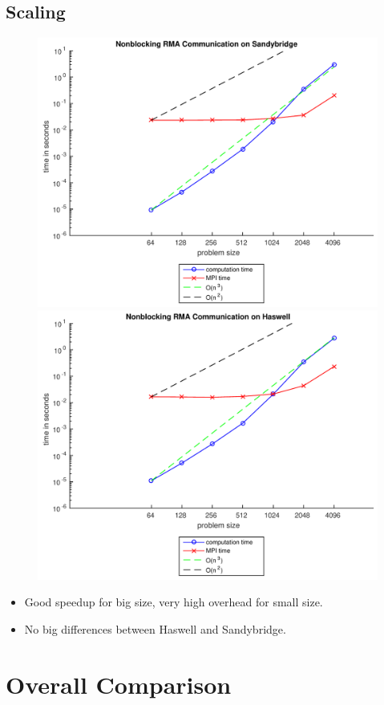 \documentclass[9pt,pdftex]{beamer}
\begin{document}
\subsection{Scaling}
\begin{frame}{\insertsubsection}
\begin{figure}
\includegraphics[width=.5\textwidth]{Pictures/Task5SB}
\hfill
\includegraphics[width=.5\textwidth]{Pictures/Task5HW}
\end{figure}
\begin{itemize}
\item Good speedup for big size, very high overhead for small size.
\item No big differences between Haswell and Sandybridge.
\end{itemize}
\end{frame}

\section{Overall Comparison}
\begin{frame}{\phantom{Contents}}
\tableofcontents[
  currentsection  
]
\end{frame}
\end{document}
